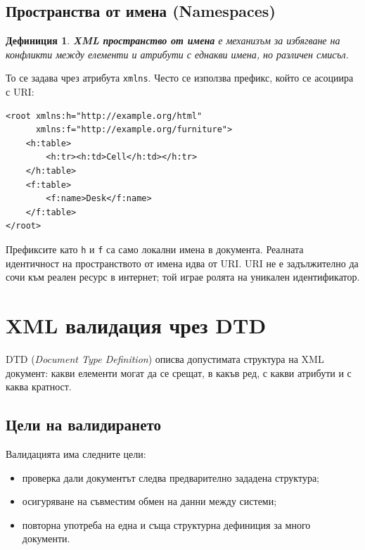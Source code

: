 \documentclass{scrartcl}
\newtheorem{definition}{Дефиниция}
\begin{document}
\begin{FlushLeft}
\subsection{Пространства от имена (Namespaces)}

\begin{definition}
\textbf{XML пространство от имена} е механизъм за избягване на конфликти между елементи и атрибути с еднакви имена, но различен смисъл.
\end{definition}

То се задава чрез атрибута \texttt{xmlns}. Често се използва префикс, който се асоциира с URI:

\begin{lstlisting}[caption=Namespace example]
<root xmlns:h="http://example.org/html"
      xmlns:f="http://example.org/furniture">
    <h:table>
        <h:tr><h:td>Cell</h:td></h:tr>
    </h:table>
    <f:table>
        <f:name>Desk</f:name>
    </f:table>
</root>
\end{lstlisting}

Префиксите като \texttt{h} и \texttt{f} са само локални имена в документа. Реалната идентичност на пространството от имена идва от URI. URI не е задължително да сочи към реален ресурс в интернет; той играе ролята на уникален идентификатор.

\section{XML валидация чрез DTD}

DTD (\textit{Document Type Definition}) описва допустимата структура на XML документ: какви елементи могат да се срещат, в какъв ред, с какви атрибути и с каква кратност.

\subsection{Цели на валидирането}

Валидацията има следните цели:

\begin{itemize}
    \item проверка дали документът следва предварително зададена структура;
    \item осигуряване на съвместим обмен на данни между системи;
    \item повторна употреба на една и съща структурна дефиниция за много документи.
\end{itemize}


\end{FlushLeft}
\end{document}
